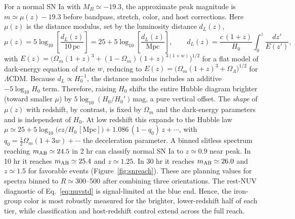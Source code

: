 \documentclass[10pt,onecolumn]{article}
\begin{document}
For a normal SN Ia with $M_B\simeq-19.3$, the approximate peak magnitude is $m\simeq\mu(z)-19.3$ before bandpass, stretch, color, and host corrections. Here $\mu(z)$ is the distance modulus, set by the luminosity distance $d_L(z)$,
\begin{equation}
\mu(z)=5\log_{10}\!\left[\frac{d_L(z)}{10\,\mathrm{pc}}\right]=25+5\log_{10}\!\left[\frac{d_L(z)}{\mathrm{Mpc}}\right],
\qquad
d_L(z)=\frac{c\,(1+z)}{H_0}\int_0^z\frac{dz'}{E(z')},
\label{eq:distmod}
\end{equation}
with $E(z)=\big(\Omega_m(1+z)^3+(1-\Omega_m)(1+z)^{3(1+w)}\big)^{1/2}$ for a flat model of dark-energy equation of state $w$, reducing to $E(z)=\big(\Omega_m(1+z)^3+\Omega_\Lambda\big)^{1/2}$ for $\Lambda$CDM. Because $d_L\propto H_0^{-1}$, the distance modulus includes an additive $-5\log_{10}H_0$ term. Therefore, raising $H_0$ shifts the entire Hubble diagram brighter (toward smaller $\mu$) by $5\log_{10}(H_0/H_0')$\,mag, a pure vertical offset. The \emph{shape} of $\mu(z)$ with redshift, by contrast, is fixed by $\Omega_m$ and the dark-energy parameters and is independent of $H_0$. At low redshift this expands to the Hubble law $\mu\simeq25+5\log_{10}\!\big(cz/H_0\,[\mathrm{Mpc}]\big)+1.086\,(1-q_0)\,z+\cdots$, with $q_0=\tfrac12\Omega_m(1+3w)+\cdots$ the deceleration parameter. A binned slitless spectrum reaching $m_{\rm AB}\simeq24.5$ in 2 hr can classify normal SN Ia to $z\simeq0.9$ near peak. In 10 hr it reaches $m_{\rm AB}\simeq25.4$ and $z\simeq1.25$. In 30 hr it reaches $m_{\rm AB}\simeq26.0$ and $z\simeq1.5$ for favorable events (Figure~\ref{fig:snreach}). These are planning values for spectra binned to $R\simeq300$--500 after combining three orientations. The rest-NUV diagnostic of Eq.~\eqref{eq:nuvstd} is signal-limited at the blue end. Hence, the iron-group color is most robustly measured for the brighter, lower-redshift half of each tier, while classification and host-redshift control extend across the full reach.
\end{document}

